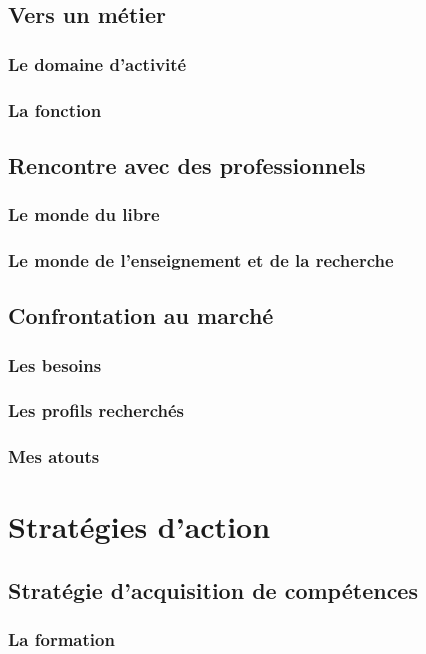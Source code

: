 \documentclass[a4paper,12pt, draft]{report}
\begin{document}
\chapter{Vers un métier}
\section{Le domaine d'activité}
\section{La fonction}

\chapter{Rencontre avec des professionnels}
\section{Le monde du libre}
\section{Le monde de l'enseignement et de la recherche}

\chapter{Confrontation au marché}
\section{Les besoins}
\section{Les profils recherchés}
\section{Mes atouts}

\part{Stratégies d'action}

\chapter{Stratégie d'acquisition de compétences}
\section{La formation}
\end{document}
